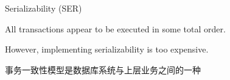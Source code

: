 
\begin{frame}{}
\end{frame}




\begin{frame}{Serializability (SER)}
  \begin{center}
    All transactions appear to be executed in some total order.

    \vspace{0.30cm}
		\resizebox{0.50\textwidth}{!}{}

    \vspace{0.20cm}
    However, implementing serializability is too expensive.
  \end{center}
\end{frame}

\begin{frame}{}
  \begin{center}
    事务一致性模型是数据库系统与上层业务之间的一种

    \vspace{0.30cm}
  \end{center}
\end{frame}

\begin{frame}{}
  \begin{center}

  \end{center}
\end{frame}

